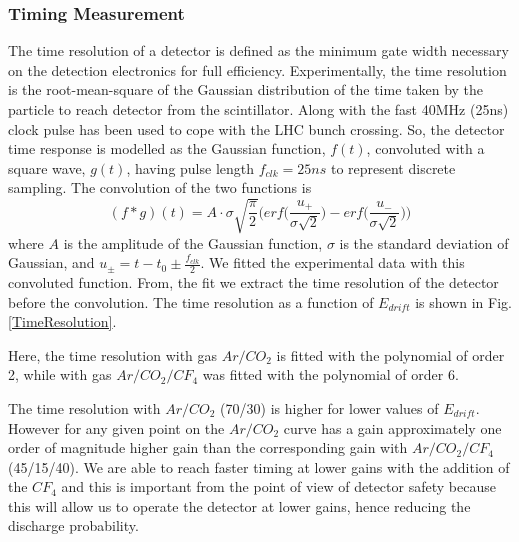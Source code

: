 \subsubsection{Timing Measurement}
The time resolution of a detector is defined as the minimum gate width necessary on the detection electronics for full efficiency.
Experimentally, the time resolution is the root-mean-square of the Gaussian distribution of the time taken by the particle to reach detector from the scintillator.
Along with the fast 40MHz (25ns) clock pulse has been used to cope with the LHC bunch crossing. So, the detector time response is modelled as the Gaussian function, $f(t)$, convoluted with a square wave, $g(t)$, having pulse length $f_{clk}=25ns$ to represent discrete sampling. 
The convolution of the two functions is
\begin{equation}
(f*g)(t) = A \cdot \sigma \sqrt{\frac{\pi}{2}}\Big(erf\Big(\frac{u_{+}}{\sigma\sqrt{2}}\Big)-erf\Big(\frac{u_{-}}{\sigma\sqrt{2}}\Big)\Big)
\end{equation}
where $A$ is the amplitude of the Gaussian function, $\sigma$ is the standard deviation of Gaussian, and $u_{\pm}= t-t_0\pm\frac{f_{clk}}{2}$. 
We fitted the experimental data with this convoluted function. From, the fit we extract the time resolution of the detector before the convolution. The time resolution as a function of $E_{drift}$ is shown in Fig. \ref{TimeResolution}. 

Here, the time resolution  with gas $Ar/CO_2$ is fitted with the polynomial of order 2, while with gas $Ar/CO_2/CF_4$ was fitted with the polynomial of order 6.

The time resolution with $Ar/CO_2$ (70/30) is higher for lower values of $E_{drift}$. However for any given point on the $Ar/CO_2$ curve has a gain approximately one order of magnitude higher gain than the corresponding gain with $Ar/CO_2/CF_4$ (45/15/40).  We are able to reach faster timing at lower gains with the addition of the $CF_4$ and this is important from the point of view of detector safety because this will allow us to operate the detector at lower gains, hence reducing the discharge probability.


